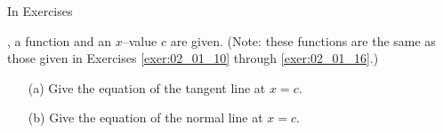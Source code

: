 {\noindent In Exercises}
{, a function and an $x$--value $c$ are given. (Note: these functions are the same as those given in Exercises \ref{exer:02_01_10} through \ref{exer:02_01_16}.)
\begin{enumerate}
\item	[(a)] Give the equation of  the tangent line at $x=c$.
\item	[(b)] Give the equation of  the normal line  at $x=c$.
\end{enumerate}
}
